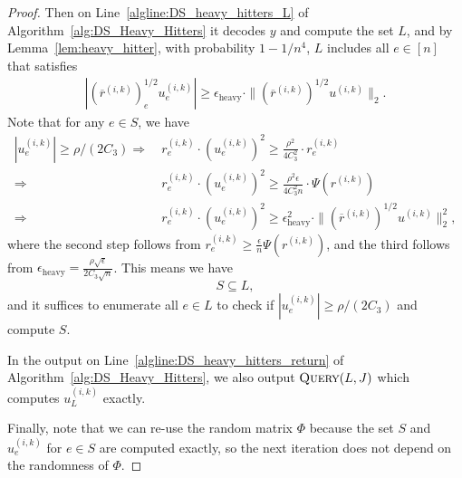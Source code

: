 \documentclass[11pt]{article}
\def\implies{\Rightarrow}
\newcommand\rr{\boldsymbol{\mathit{r}}}
\newcommand\uu{\boldsymbol{\mathit{u}}}
\newcommand\yy{\boldsymbol{\mathit{y}}}
\newcommand{\ov}{\overline}
\newcommand{\heavy}{\text{heavy}}
\begin{document}
\begin{proof}
Then on Line~\ref{algline:DS_heavy_hitters_L} of Algorithm~\ref{alg:DS_Heavy_Hitters} it decodes $\yy$ and compute the set $L$, and by Lemma~\ref{lem:heavy_hitter}, with probability $1 - 1/n^4$, $L$ includes all $e \in [n]$ that satisfies
\begin{align*}
    |(\ov{\rr}^{(i,k)})_e^{1/2} \uu^{(i,k)}_e| \geq \epsilon_{\heavy} \cdot \|(\ov{\rr}^{(i,k)})^{1/2} \uu^{(i,k)}\|_2.
\end{align*}
Note that for any $e \in S$, we have
\begin{align*}
|\uu^{(i,k)}_e|\geq \rho/(2C_3) 
\implies &~ \rr^{(i,k)}_e \cdot (\uu^{(i,k)}_e)^2 \geq \frac{\rho^2}{4 C_3^2} \cdot \rr^{(i,k)}_e \\
\implies &~ \rr^{(i,k)}_e \cdot (\uu^{(i,k)}_e)^2 \geq \frac{\rho^2 \epsilon}{4 C_3^2 n} \cdot \Psi(\rr^{(i,k)}) \\
\implies &~ \rr^{(i,k)}_e \cdot (\uu^{(i,k)}_e)^2 \geq \epsilon_{\heavy}^2 \cdot \|(\ov{\rr}^{(i,k)})^{1/2} \uu^{(i,k)}\|_2^2,
\end{align*}
where the second step follows from $\rr^{(i,k)}_e \geq \frac{\epsilon}{n} \Psi(\rr^{(i,k)})$, and the third follows from $\epsilon_{\heavy} = \frac{\rho \sqrt{\epsilon}}{2 C_3 \sqrt{n}}$. This means we have
\[
S \subseteq L,
\]
and it suffices to enumerate all $e \in L$ to check if $|\uu^{(i,k)}_e|\geq \rho/(2C_3)$ and compute $S$.

In the output on Line~\ref{algline:DS_heavy_hitters_return} of Algorithm~\ref{alg:DS_Heavy_Hitters}, we also output $\textsc{Query}(L, J)$ which computes $\uu^{(i,k)}_L$ exactly.

Finally, note that we can re-use the random matrix $\Phi$ because the set $S$ and $\uu_e^{(i,k)}$ for $e \in S$ are computed exactly, so the next iteration does not depend on the randomness of $\Phi$.
\end{proof}
\end{document}
